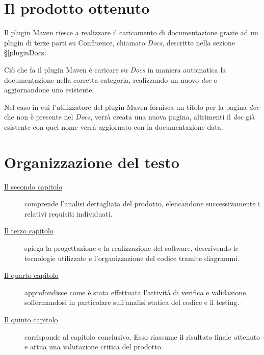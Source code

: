\section{Il prodotto ottenuto}
Il plugin Maven riesce a realizzare il caricamento di documentazione grazie ad un plugin di terze parti su Confluence, chiamato \emph{Docs}, descritto nella sezione \S\ref{pluginDocs}.

Ciò che fa il plugin Maven è caricare su \emph{Docs} in maniera automatica la documentazione nella corretta categoria, realizzando un nuovo \emph{doc} o aggiornandone uno esistente.

Nel caso in cui l'utilizzatore del plugin Maven fornisca un titolo per la pagina \emph{doc} che non è presente nel \emph{Docs}, verrà creata una nuova pagina, altrimenti il \emph{doc} già esistente con quel nome verrà aggiornato con la documentazione data.

\section{Organizzazione del testo}

\begin{description}
    \item[{\hyperref[cap:analisi-requisiti]{Il secondo capitolo}}] comprende l'analisi dettagliata del prodotto, elencandone successivamente i relativi requisiti individuati.

    \item[{\hyperref[cap:progettazione]{Il terzo capitolo}}] spiega la progettazione e la realizzazione del software, descrivendo le tecnologie utilizzate e l'organizzazione del codice tramite diagrammi.

    \item[{\hyperref[cap:testing]{Il quarto capitolo}}] approfondisce come è stata effettuata l'attività di verifica e validazione, soffermandosi in particolare sull'analisi statica del codice e il testing.

    \item[{\hyperref[cap:conclusioni]{Il quinto capitolo}}] corrisponde al capitolo conclusivo. Esso riassume il risultato finale ottenuto e attua una valutazione critica del prodotto.

\end{description}

